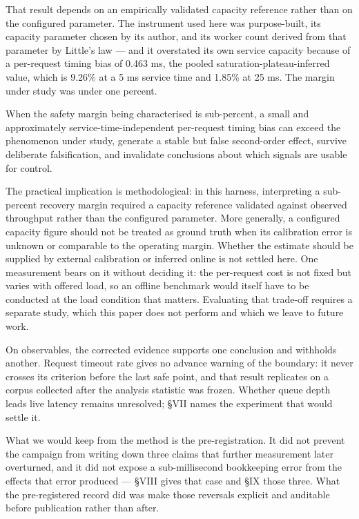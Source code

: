 \documentclass{ieeeaccess}
\begin{document}
That result depends on an empirically validated capacity reference rather than on the configured parameter. The instrument used here was purpose-built, its capacity parameter chosen by its author, and its worker count derived from that parameter by Little's law --- and it overstated its own service capacity because of a per-request timing bias of 0.463 ms, the pooled saturation-plateau-inferred value, which is 9.26\% at a 5 ms service time and 1.85\% at 25 ms. The margin under study was under one percent.

When the safety margin being characterised is sub-percent, a small and approximately service-time-independent per-request timing bias can exceed the phenomenon under study, generate a stable but false second-order effect, survive deliberate falsification, and invalidate conclusions about which signals are usable for control.

The practical implication is methodological: in this harness, interpreting a sub-percent recovery margin required a capacity reference validated against observed throughput rather than the configured parameter. More generally, a configured capacity figure should not be treated as ground truth when its calibration error is unknown or comparable to the operating margin. Whether the estimate should be supplied by external calibration or inferred online is not settled here. One measurement bears on it without deciding it: the per-request cost is not fixed but varies with offered load, so an offline benchmark would itself have to be conducted at the load condition that matters. Evaluating that trade-off requires a separate study, which this paper does not perform and which we leave to future work.

On observables, the corrected evidence supports one conclusion and withholds another. Request timeout rate gives no advance warning of the boundary: it never crosses its criterion before the last safe point, and that result replicates on a corpus collected after the analysis statistic was frozen. Whether queue depth leads live latency remains unresolved; \S{}VII names the experiment that would settle it.

What we would keep from the method is the pre-registration. It did not prevent the campaign from writing down three claims that further measurement later overturned, and it did not expose a sub-millisecond bookkeeping error from the effects that error produced --- \S{}VIII gives that case and \S{}IX those three. What the pre-registered record did was make those reversals explicit and auditable before publication rather than after.
\end{document}
